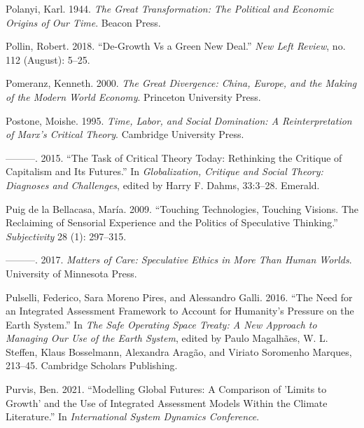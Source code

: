 \documentclass[a4paper, nobind]{templates/ociamthesis}
\newlength{\cslhangindent}
\newenvironment{CSLReferences}[2] %
 {%
  \setlength{\parindent}{0pt}
  \ifodd #1
  \let\oldpar\par
  \def\par{\hangindent=\cslhangindent\oldpar}
  \fi
  \setlength{\parskip}{1mm}
  \setlength{\baselineskip}{6mm}
 }%
 {}
\begin{document}
\begin{CSLReferences}{1}{0}
\leavevmode{}%
Polanyi, Karl. 1944. \emph{The {Great Transformation}: {The Political} and {Economic Origins} of {Our Time}}. {Beacon Press}.

\leavevmode{}%
Pollin, Robert. 2018. {``De-{Growth} Vs a {Green New Deal}.''} \emph{New Left Review}, no. 112 (August): 5--25.

\leavevmode{}%
Pomeranz, Kenneth. 2000. \emph{The {Great Divergence}: {China}, {Europe}, and the {Making} of the {Modern World Economy}}. {Princeton University Press}.

\leavevmode{}%
Postone, Moishe. 1995. \emph{Time, {Labor}, and {Social Domination}: {A Reinterpretation} of {Marx}'s {Critical Theory}}. {Cambridge University Press}.

\leavevmode{}%
---------. 2015. {``The {Task} of {Critical Theory Today}: {Rethinking} the {Critique} of {Capitalism} and Its {Futures}.''} In \emph{Globalization, {Critique} and {Social Theory}: {Diagnoses} and {Challenges}}, edited by Harry F. Dahms, 33:3--28. {Emerald}.

\leavevmode{}%
Puig de la Bellacasa, María. 2009. {``Touching Technologies, Touching Visions. {The} Reclaiming of Sensorial Experience and the Politics of Speculative Thinking.''} \emph{Subjectivity} 28 (1): 297--315.

\leavevmode{}%
---------. 2017. \emph{Matters of {Care}: {Speculative Ethics} in {More Than Human Worlds}}. {University of Minnesota Press}.

\leavevmode{}%
Pulselli, Federico, Sara Moreno Pires, and Alessandro Galli. 2016. {``The {Need} for an {Integrated Assessment Framework} to {Account} for {Humanity}'s {Pressure} on the {Earth System}.''} In \emph{The Safe Operating Space Treaty: A New Approach to Managing Our Use of the {Earth} System}, edited by Paulo Magalhães, W. L. Steffen, Klaus Bosselmann, Alexandra Aragão, and Viriato Soromenho Marques, 213--45. {Cambridge Scholars Publishing}.

\leavevmode{}%
Purvis, Ben. 2021. {``Modelling Global Futures: A Comparison of '{Limits} to {Growth}' and the Use of {Integrated Assessment Models} Within the Climate Literature.''} In \emph{International {System Dynamics Conference}}.


\end{CSLReferences}
\end{document}
